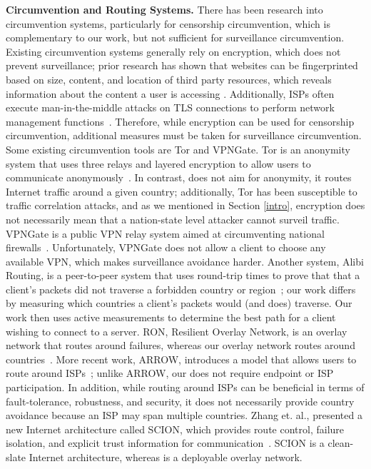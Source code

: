 \textbf{Circumvention and Routing Systems.}  There has been research into
circumvention systems, particularly for censorship circumvention, which is 
complementary to our work, but not sufficient for surveillance circumvention.  
Existing circumvention systems generally rely on encryption, which does not 
prevent surveillance; prior research has shown that websites can be 
fingerprinted based on size, content, and location of third party resources, which 
reveals information about the content a user is accessing \cite{what_isps_can_see}.  Additionally, 
ISPs often execute man-in-the-middle attacks on TLS connections to perform 
network management functions~\cite{mitm_isp}.  Therefore, while encryption can be 
used for censorship circumvention, additional measures must be taken for 
surveillance circumvention.  Some existing circumvention tools are Tor and VPNGate.
Tor is an anonymity system that uses three relays and layered encryption
to allow users to communicate anonymously~\cite{dingledine2004tor}.  In contrast, \system{}
does not aim for anonymity, it routes Internet traffic around a given country; additionally, 
Tor has been susceptible to traffic correlation attacks, and as we mentioned in Section \ref{intro}, 
encryption does not necessarily mean that a nation-state level attacker cannot surveil traffic.
VPNGate is a public VPN relay system aimed at circumventing national
firewalls~\cite{nobori2014vpn}.  Unfortunately, VPNGate does not allow a
client to choose any available VPN, which makes surveillance avoidance
harder.  Another system, Alibi Routing, is a peer-to-peer system that 
uses round-trip times to prove that that a client's packets did 
not traverse a forbidden country or region~\cite{levin2015alibi}; our work differs by measuring 
which countries a client's packets would (and does) traverse.  Our work then 
uses active measurements to determine the best path for a client wishing 
to connect to a server.  RON, Resilient Overlay Network, is an overlay network that 
routes around failures, whereas our overlay network routes around countries~\cite{andersen2001resilient}.  
More recent work, ARROW, introduces a model that allows users to route around ISPs~\cite{peter2015one}; unlike ARROW, 
our \system{} does not require endpoint or ISP participation.  In addition, while routing around ISPs 
can be beneficial in terms of fault-tolerance, robustness, and security, it does not necessarily provide 
country avoidance because an ISP may span multiple countries.  Zhang et. al., presented a new Internet 
architecture called SCION, which provides route control, failure isolation, and explicit trust information for 
communication~\cite{zhang2011scion}.  SCION is a clean-slate Internet architecture, whereas \system{} is a deployable overlay 
network.

